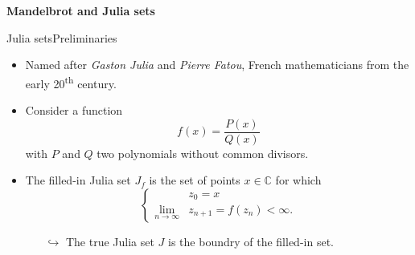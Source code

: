 \documentclass[usenames,dvipsnames,svgnames,10pt,aspectratio=169]{beamer}
\begin{document}


\begin{frame}[t, c]{}
	\centering
	\vspace{1cm}

	{\Large \textbf{Mandelbrot and Julia sets}}

	\bigskip

	{}

\end{frame}

\begin{frame}[t, c]{Julia sets}{Preliminaries}
	\begin{itemize}
		\item Named after \emph{Gaston Julia} and \emph{Pierre Fatou}, French mathematicians from the early 20\textsuperscript{th} century.
		\medskip
		\item Consider a function
		$$
		f(x) = \displaystyle \frac{P(x)}{Q(x)}
		$$
		with $P$ and $Q$ two polynomials without common divisors.
		\medskip
		\item The filled-in Julia set $J_f$ is the set of points $x \in \mathbb{C}$ for which
		$$
		\left\{
		\begin{aligned}
			& z_0 = x \\
			\lim_{n \to \infty} & z_{n+1} = f(z_n) < \infty.
		\end{aligned}
		\right.
		$$
		\begin{itemize}
			\item[$\hookrightarrow$] The true Julia set $J$ is the boundry of the filled-in set.
		\end{itemize}
	\end{itemize}
	\vspace{1cm}
\end{frame}
\end{document}
